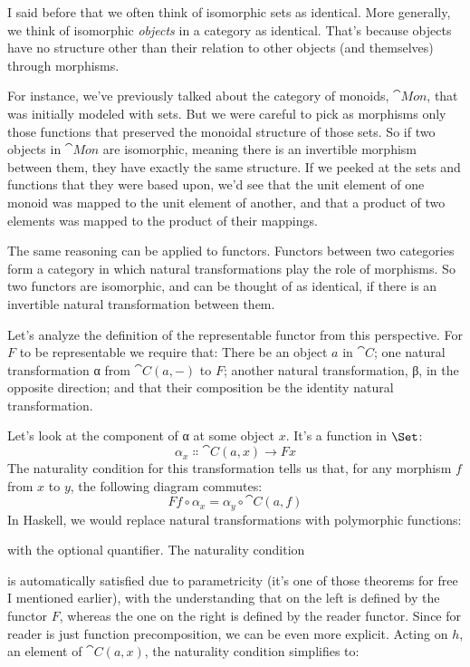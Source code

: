 I said before that we often think of isomorphic sets as identical. More
generally, we think of isomorphic \emph{objects} in a category as
identical. That's because objects have no structure other than their
relation to other objects (and themselves) through morphisms.

For instance, we've previously talked about the category of monoids,
$\cat{Mon}$, that was initially modeled with sets. But we were careful
to pick as morphisms only those functions that preserved the monoidal
structure of those sets. So if two objects in $\cat{Mon}$ are
isomorphic, meaning there is an invertible morphism between them, they
have exactly the same structure. If we peeked at the sets and functions
that they were based upon, we'd see that the unit element of one monoid
was mapped to the unit element of another, and that a product of two
elements was mapped to the product of their mappings.

The same reasoning can be applied to functors. Functors between two
categories form a category in which natural transformations play the
role of morphisms. So two functors are isomorphic, and can be thought of
as identical, if there is an invertible natural transformation between
them.

Let's analyze the definition of the representable functor from this
perspective. For $F$ to be representable we require that: There
be an object $a$ in $\cat{C}$; one natural transformation α from
$\cat{C}(a, -)$ to $F$; another natural transformation, β, in
the opposite direction; and that their composition be the identity
natural transformation.

Let's look at the component of α at some object $x$. It's a
function in $\Set$:
\[\alpha_x \Colon \cat{C}(a, x) \to F x\]
The naturality condition for this transformation tells us that, for any
morphism $f$ from $x$ to $y$, the following diagram
commutes:
\[F f \circ \alpha_x = \alpha_y \circ \cat{C}(a, f)\]
In Haskell, we would replace natural transformations with polymorphic
functions:

with the optional  quantifier. The naturality condition

is automatically satisfied due to parametricity (it's one of those
theorems for free I mentioned earlier), with the understanding that
 on the left is defined by the functor $F$, whereas
the one on the right is defined by the reader functor. Since
 for reader is just function precomposition, we can be even
more explicit. Acting on $h$, an element of $\cat{C}(a, x)$,
the naturality condition simplifies to:

